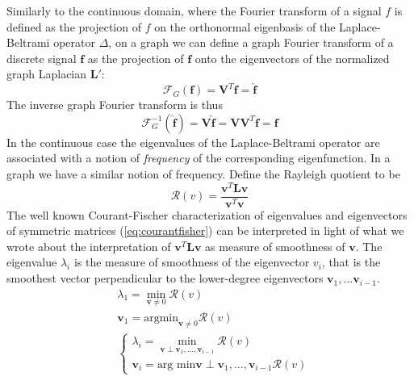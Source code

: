 Similarly to the continuous domain, where the Fourier transform of a signal $f$ is defined as the projection of $f$ on the orthonormal eigenbasis of the Laplace-Beltrami operator $\Delta$, on a graph we can define a graph Fourier transform of a discrete signal $\mathbf f$ as the projection of $\mathbf f$ onto the eigenvectors of the normalized graph Laplacian $\mathbf L'$:
\begin{equation}\label{eq:graph fourier}
\mathcal F_G(\mathbf f) = \mathbf V^T\mathbf f = \hat{\mathbf f}
\end{equation}
The inverse graph Fourier transform is thus 
\begin{equation}\label{eq:graph fourier inverse}
\mathcal F^{-1}_G(\hat{\mathbf f}) = \mathbf V \hat{\mathbf f} = \mathbf V\mathbf V^T\mathbf f = {\mathbf f}
\end{equation}
In the continuous case the eigenvalues of the Laplace-Beltrami operator are associated with a notion of \textit{frequency} of the corresponding eigenfunction. In a graph we have a similar notion of frequency. Define the Rayleigh quotient to be
\begin{equation}\label{eq:Rayleigh}
	\mathcal R(v) = \frac{\mathbf v^T\mathbf L \mathbf v}{\mathbf v^T\mathbf v}
\end{equation}
The well known Courant-Fischer characterization of eigenvalues and eigenvectors of symmetric matrices (\ref{eq:courantfisher}) can be interpreted in light of what we wrote about the interpretation of $\mathbf v^T \mathbf L \mathbf v$ as measure of smoothness of $\mathbf v$. The eigenvalue $\lambda_i$ is the measure of smoothness of the eigenvector $v_i$, that is the smoothest vector perpendicular to the lower-degree eigenvectors $\mathbf v_1, ... \mathbf v_{i-1}$.
\begin{equation}\label{eq:courantfisher}
	\begin{aligned} 
	&\lambda_1 = \min_{\mathbf v\neq 0} \mathcal R(v)\\
	&\mathbf v_1 = \text{argmin}_{\mathbf v\neq 0} \mathcal R(v)\\
	&\begin{cases}
	\lambda_i = \min_{\mathbf v\perp \mathbf v_1, ..., \mathbf v_{i-1}} \mathcal R(v)\\
	\mathbf v_i = \text{arg min}{\mathbf v\perp \mathbf v_1, ..., \mathbf v_{i-1}}  \mathcal R(v)
	\end{cases}
	\end{aligned}	
\end{equation}
